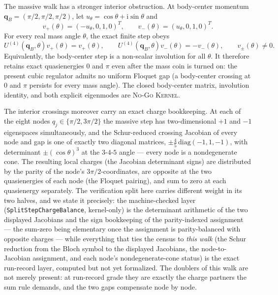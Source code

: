\documentclass[11pt]{article}
\newcommand{\Kernel}{\textcolor{kernelcolor}{\textsc{Kernel}}}
\newcommand{\NoGo}{\textsc{No-Go}}
\newcommand{\ii}{\mathrm{i}}
\begin{document}
The massive walk has a stronger interior obstruction.  At body-center momentum
$\mathbf q_B=(\pi/2,\pi/2,\pi/2)$, let
$u_\theta=\cos\theta+\ii\sin\theta$ and
\[
 v_+(\theta)=(-u_\theta,0,1,0)^T,
 \qquad
 v_-(\theta)=(u_\theta,0,1,0)^T.
\]
For every real mass angle $\theta$, the exact finite step obeys
\begin{equation}\label{eq:bodycentermodes}
 U^{(4)}(\mathbf q_B,\theta)v_+(\theta)=v_+(\theta),
 \qquad
 U^{(4)}(\mathbf q_B,\theta)v_-(\theta)=-v_-(\theta),
 \qquad v_\pm(\theta)\neq0.
\end{equation}
Equivalently, the body-center step is a non-scalar involution for all
$\theta$.  It therefore retains exact quasienergies $0$ and $\pi$ even after
the mass coin is turned on: the present cubic regulator admits no uniform
Floquet gap (a body-center crossing at $0$ and $\pi$ persists for every
mass angle).
The closed body-center matrix, involution identity, and both explicit
eigenmodes are \NoGo{} \Kernel{}.

The interior crossings moreover carry an exact charge bookkeeping.  At
each of the eight nodes $q_j\in\{\pi/2,3\pi/2\}$ the massive step has
two-dimensional $+1$ and $-1$ eigenspaces simultaneously, and the
Schur-reduced crossing Jacobian of every node and gap is one of exactly
two diagonal matrices, $\pm\tfrac45\,\mathrm{diag}(-1,1,-1)$, with
determinant $\pm(\cos\theta)^3$ at the $3$-$4$-$5$ angle --- every node
is a nondegenerate cone.  The resulting local charges (the Jacobian
determinant signs) are distributed by the parity of the node's
$3\pi/2$-coordinates, are opposite at the two quasienergies of each
node (the Floquet pairing), and sum to zero at each quasienergy
separately.  The verification split here carries different weight in
its two halves, and we state it precisely: the machine-checked layer
(\texttt{SplitStepChargeBalance}, kernel-only) is the determinant
arithmetic of the two displayed Jacobians and the sign bookkeeping of
the parity-indexed assignment --- the sum-zero being elementary once
the assignment is parity-balanced with opposite charges --- while
everything that ties the census to \emph{this walk} (the Schur
reduction from the Bloch symbol to the displayed Jacobians, the
node-to-Jacobian assignment, and each node's nondegenerate-cone
status) is the exact run-record layer, computed but not yet
formalized.  The doublers of this walk are
not merely present: at run-record grade they are exactly the charge
partners the sum rule demands, and the two gaps compensate node by
node.
\end{document}
